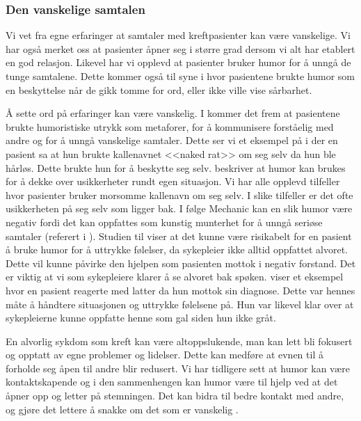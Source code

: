 \subsubsection{Den vanskelige samtalen}

Vi vet fra egne erfaringer at samtaler med kreftpasienter kan være vanskelige.
Vi har også merket oss at pasienter åpner seg i større grad dersom vi alt har
etablert en god relasjon. Likevel har vi opplevd at pasienter bruker humor for
å unngå de tunge samtalene. Dette kommer også til syne i 
hvor pasientene brukte humor som en beskyttelse når de gikk tomme for ord,
eller ikke ville vise sårbarhet.

Å sette ord på erfaringer kan være vanskelig. I  kommer det
frem at pasientene brukte humoristiske utrykk som metaforer, for å kommunisere
forståelig med andre og for å unngå vanskelige samtaler. Dette ser vi et
eksempel på i  der en pasient sa at hun brukte kallenavnet
<<naked rat>> om seg selv da hun ble hårløs. Dette brukte hun for å beskytte
seg selv.  beskriver at humor kan brukes for å dekke over
usikkerheter rundt egen situasjon. Vi har alle opplevd tilfeller hvor pasienter
bruker morsomme kallenavn om seg selv. I slike tilfeller er det ofte
usikkerheten på seg selv som ligger bak. I følge Mechanic kan en slik humor
være negativ fordi det kan oppfattes som kunstig munterhet for å unngå seriøse
samtaler (referert i ). Studien til 
viser at det kunne være risikabelt for en pasient å bruke humor for å uttrykke
følelser, da sykepleier ikke alltid oppfattet alvoret. Dette vil kunne påvirke
den hjelpen som pasienten mottok i negativ forstand. Det er viktig at vi som
sykepleiere klarer å se alvoret bak spøken.  viser et
eksempel hvor en pasient reagerte med latter da hun mottok sin diagnose. Dette
var hennes måte å håndtere situasjonen og uttrykke følelsene på. Hun var
likevel klar over at sykepleierne kunne oppfatte henne som gal siden hun ikke
gråt.

En alvorlig sykdom som kreft kan være altoppslukende, man kan lett bli fokusert
og opptatt av egne problemer og lidelser. Dette kan medføre at evnen til å
forholde seg åpen til andre blir redusert. Vi har tidligere sett at humor kan
være kontaktskapende og i den sammenhengen kan humor være til hjelp ved at det
åpner opp og letter på stemningen. Det kan bidra til bedre kontakt med andre,
og gjøre det lettere å snakke om det som er vanskelig \cite{eide2008}.

